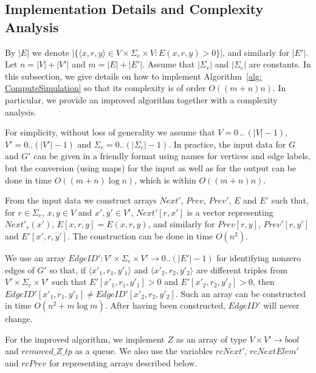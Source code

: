\documentclass[11pt]{article}
\def\tuple#1{\langle#1\rangle}
\newcommand{\SV}{\Sigma_v}
\newcommand{\SE}{\Sigma_e}
\newcommand{\Prev}{\mathit{Prev}}
\newcommand{\NextP}{\mathit{Next}'}
\newcommand{\PrevP}{\mathit{Prev}'}
\newcommand{\removeZ}{\textit{removed\_Z\_tp}}
\newcommand{\EdgeIDp}{\mathit{EdgeID}'}
\newcommand{\Bool}{\mathit{bool}}
\newcommand{\rcNextP}{\mathit{rcNext}'}
\newcommand{\rcPrev}{\mathit{rcPrev}}
\newcommand{\rcNextElemP}{\mathit{rcNextElem}'}
\begin{document}
\subsection{Implementation Details and Complexity Analysis}
\label{section: comp-CS2}

By $|E|$ we denote $|\{\tuple{x,r,y} \in V \times \SE \times V : E(x,r,y) > 0\}|$, and similarly for $|E'|$. 
Let $n = |V| + |V'|$ and $m = |E| + |E'|$. Assume that $|\SV|$ and $|\SE|$ are constants. 
%
In this subsection, we give details on how to implement Algorithm~\ref{alg: ComputeSimulation} so that its complexity is of order $O((m+n)n)$. In particular, we provide an improved algorithm together with a complexity analysis. 

For simplicity, without loss of generality we assume that $V = 0\,..\,(|V|-1)$, $V' = 0..(|V'|-1)$ and $\SE = 0..(|\SE|-1)$. In practice, the input data for $G$ and $G'$ can be given in a friendly format using names for vertices and edge labels, but the conversion (using maps) for the input as well as for the output can be done in time $O((m+n)\log{n})$, which is within $O((m+n)n)$. 
 
From the input data we construct arrays $\NextP$, $\Prev$, $\PrevP$, $E$ and $E'$ such that, for $r \in \SE$, $x,y \in V$ and $x',y' \in V'$, $\NextP[r,x']$ is a vector representing $\NextP_r(x')$, $E[x,r,y] = E(x,r,y)$, and similarly for $\Prev[r,y]$, $\PrevP[r,y']$ and $E'[x',r,y']$. The construction can be done in time $O(n^2)$. 

We use an array $\EdgeIDp : V' \times \SE \times V' \to 0..(|E'|-1)$ for identifying nonzero edges of $G'$ so that, if $\tuple{x'_1,r_1,y'_1}$ and $\tuple{x'_2,r_2,y'_2}$ are different triples from $V' \times \SE \times V'$ such that $E'[x'_1,r_1,y'_1] > 0$ and $E'[x'_2,r_2,y'_2] > 0$, then $\EdgeIDp[x'_1,r_1,y'_1] \neq \EdgeIDp[x'_2,r_2,y'_2]$. 
%
Such an array can be constructed in time $O(n^2 + m\log{m})$. After having been constructed, $\EdgeIDp$ will never change. 

For the improved algorithm, we implement $Z$ as an array of type $V \times V' \to \Bool$ and $\removeZ$ as a queue. 
We also use the variables $\rcNextP$, $\rcNextElemP$ and $\rcPrev$ for representing arrays described below.
\end{document}
